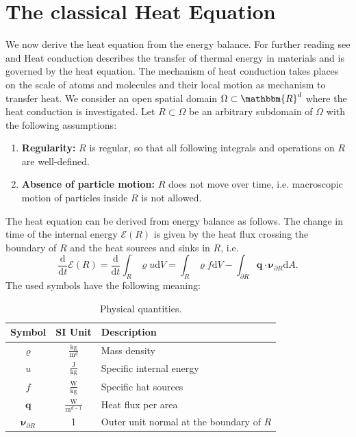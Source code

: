 \documentclass[a4paper,11pt]{article}
\theoremstyle{plain} %
\theoremstyle{definition} %
\theoremstyle{remark} %
\begin{document}
\tableofcontents
\newpage

\section{The classical Heat Equation}
We now derive the heat equation from the energy balance. For further reading see \cite[pp 207]{eck2008modellierung} and \cite[pp 105]{hoffmann2014modellierung}
Heat conduction describes the transfer of thermal energy in materials and is governed by the heat equation. The mechanism of heat conduction takes places on the scale of atoms and molecules and their local motion as mechanism to transfer heat. 
We consider an open spatial domain $\Omega \subset \mathbbm{R}^d $ where the heat conduction is investigated. 
Let $R \subset \Omega $ be an arbitrary subdomain of $\Omega $ with the following assumptions:
\begin{enumerate}
\item \textbf{Regularity:} $R$ is regular, so that all following integrals and operations on $R$ are well-defined.
\item \textbf{Absence of particle motion:} $R$ does not move over time, i.e. macroscopic motion of particles inside $R$ is not allowed.
\end{enumerate}
The heat equation can be derived from energy balance as follows. The change in time of the internal energy $\mathscr{E}(R) $ is given by the heat flux crossing the boundary of $R$ and the heat sources and sinks in $R$, i.e.
\begin{equation*}
\frac{\mathrm{d}}{\mathrm{d}t} \mathscr{E} (R) = \frac{\mathrm{d}}{\mathrm{d}t} \int_R \varrho u \mathrm{d} V = \int_R \varrho f \mathrm{d} V - \int_{\partial R } \boldsymbol{q}\cdot \boldsymbol{\nu}_{\partial R} \mathrm{d} A .
\end{equation*}
The used symbols have the following meaning:
\begin{table}[h!] 
\centering
{\renewcommand{\arraystretch}{1.4}
\begin{tabular}{ccl}
\toprule
\textbf{Symbol} & \textbf{SI Unit} & \textbf{Description}\\
\midrule
$\varrho$ & $\tfrac{\mathrm{kg}}{\mathrm{m}^d}$ & Mass density \\
$u $ & $\tfrac{\mathrm{J}}{\mathrm{kg}}$ & Specific internal energy \\
$f$ & $\tfrac{\mathrm{W}}{\mathrm{kg}}$ & Specific hat sources \\
$\boldsymbol{q}$ & $\tfrac{\mathrm{W}}{\mathrm{m}^{d-1}}$ & Heat flux per area\\
$\boldsymbol{\nu}_{\partial R}$ & 1 & Outer unit normal at the boundary of $R$\\
\bottomrule
\end{tabular}}
\caption{Physical quantities.}
\label{TablePhysicalQuantities}
\end{table}
\end{document}
